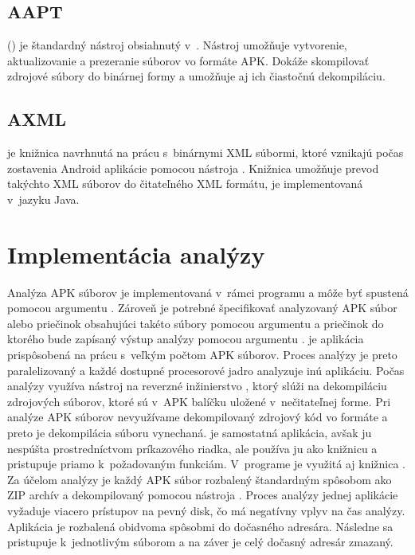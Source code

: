 \subsection{AAPT}
\label{AAPT}

 () je štandardný nástroj obsiahnutý v~. Nástroj  umožňuje vytvorenie, aktualizovanie a prezeranie súborov vo formáte APK. Dokáže skompilovať zdrojové súbory do binárnej formy a umožňuje aj ich čiastočnú dekompiláciu\cite{aapt}.

\subsection{AXML}
\label{AXML}
 je knižnica navrhnutá na prácu s~binárnymi XML súbormi, ktoré vznikajú počas zostavenia Android aplikácie pomocou nástroja . Knižnica umožňuje prevod takýchto XML súborov do čitateľného XML formátu, je implementovaná v~jazyku Java.

\section{Implementácia analýzy}
Analýza APK súborov je implementovaná v~rámci programu  a môže byť spustená pomocou argumentu . Zároveň je potrebné špecifikovať analyzovaný APK súbor alebo priečinok obsahujúci takéto súbory pomocou argumentu  a priečinok do ktorého bude zapísaný výstup analýzy pomocou argumentu .  je aplikácia prispôsobená na prácu s~veľkým počtom APK súborov. Proces analýzy je preto paralelizovaný a každé dostupné procesorové jadro analyzuje inú aplikáciu. Počas analýzy využíva  nástroj na reverzné inžinierstvo , ktorý slúži na dekompiláciu zdrojových súborov, ktoré sú v~APK balíčku uložené v~nečitateľnej forme. Pri analýze APK súborov nevyužívame dekompilovaný zdrojový kód vo formáte  a preto je dekompilácia súboru  vynechaná.  je samostatná aplikácia, avšak  ju nespúšta prostredníctvom príkazového riadka, ale používa ju ako knižnicu a pristupuje priamo k~požadovaným funkciám. V~programe je využitá aj knižnica . Za účelom analýzy je každý APK súbor rozbalený štandardným spôsobom ako ZIP archív a dekompilovaný pomocou nástroja . Proces analýzy jednej aplikácie vyžaduje viacero prístupov na pevný disk, čo má negatívny vplyv na čas analýzy. Aplikácia je rozbalená obidvoma spôsobmi do dočasného adresára. Následne sa pristupuje k~jednotlivým súborom a na záver je celý dočasný adresár zmazaný.

